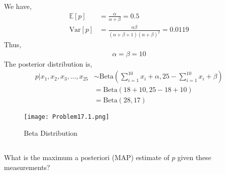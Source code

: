 \documentclass[a4paper,11pt,reqno]{amsart}
\begin{document}
We have,
$$
\begin{aligned}
    \mathbb{E}[p]&=\frac{\alpha}{\alpha+\beta}=0.5  
    \\
    \text{Var}[p]&=\frac{\alpha\beta}{(\alpha+\beta+1)(\alpha+\beta)^2}=0.0119
\end{aligned}
$$
Thus,
$$
\begin{aligned}
    \alpha=\beta=10
\end{aligned}
$$
The posterior distribution is,
$$
\begin{aligned}
    p|x_1,x_2,x_3,\dots,x_{25} &\sim \text{Beta}(\sum_{i=1}^{10}x_i+\alpha,25-\sum_{i=1}^{10}x_i+\beta) 
    \\
    &=\text{Beta}(18+10,25-18+10)
    \\
    &=\text{Beta}(28,17)
\end{aligned}
$$

\begin{figure}[H]
    \centering
    \texttt{[image: Problem17.1.png]}
    \caption{Beta Distribution}
    \label{f17.1}
    \end{figure}

\subsection{}
What is the maximum a posteriori (MAP) estimate of $p$ given these measurements?
\end{document}
